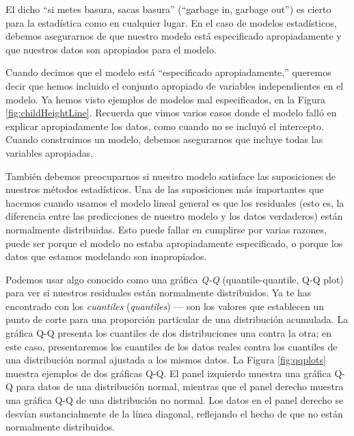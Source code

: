 \documentclass[
  12pt,
]{book}
\begin{document}
El dicho ``si metes basura, sacas basura'' (``garbage in, garbage out'') es cierto para la estadística como en cualquier lugar. En el caso de modelos estadísticos, debemos asegurarnos de que nuestro modelo está especificado apropiadamente y que nuestros datos son apropiados para el modelo.

Cuando decimos que el modelo está ``especificado apropiadamente,'' queremos decir que hemos incluido el conjunto apropiado de variables independientes en el modelo. Ya hemos visto ejemplos de modelos mal especificados, en la Figura \ref{fig:childHeightLine}. Recuerda que vimos varios casos donde el modelo falló en explicar apropiadamente los datos, como cuando no se incluyó el intercepto. Cuando construimos un modelo, debemos asegurarnos que incluye todas las variables apropiadas.

También debemos preocuparnos si nuestro modelo satisface las suposiciones de nuestros métodos estadísticos. Una de las suposiciones más importantes que hacemos cuando usamos el modelo lineal general es que los residuales (esto es, la diferencia entre las predicciones de nuestro modelo y los datos verdaderos) están normalmente distribuidas. Esto puede fallar en cumplirse por varias razones, puede ser porque el modelo no estaba apropiadamente especificado, o porque los datos que estamos modelando son inapropiados.

Podemos usar algo conocido como una gráfica \emph{Q-Q} (quantile-quantile, Q-Q plot) para ver si nuestros residuales están normalmente distribuidos. Ya te has encontrado con los \emph{cuantiles} (\emph{quantiles}) --- son los valores que establecen un punto de corte para una proporción particular de una distribución acumulada. La gráfica Q-Q presenta los cuantiles de dos distribuciones una contra la otra; en este caso, presentaremos los cuantiles de los datos reales contra los cuantiles de una distribución normal ajustada a los mismos datos. La Figura \ref{fig:qqplots} muestra ejemplos de dos gráficas Q-Q. El panel izquierdo muestra una gráfica Q-Q para datos de una distribución normal, mientras que el panel derecho muestra una gráfica Q-Q de una distribución no normal. Los datos en el panel derecho se desvían sustancialmente de la línea diagonal, reflejando el hecho de que no están normalmente distribuidos.
\end{document}
